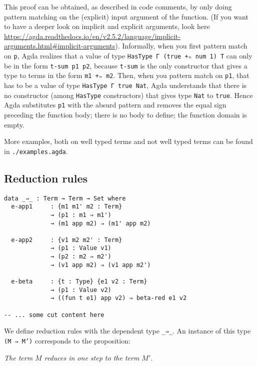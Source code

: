 \documentclass{article}
\begin{document}
\noindent
This proof can be obtained, as described in code comments, by only doing pattern matching on the (explicit) input argument of the function. (If you want to have a deeper look on implicit and explicit arguments, look here \url{https://agda.readthedocs.io/en/v2.5.2/language/implicit-arguments.html#implicit-arguments}).
Informally, when you first pattern match on \texttt{p}, Agda realizes that a value of type \texttt{HasType Γ (true +ₙ num 1) T} can only be in the form \texttt{t-sum p1 p2}, because \texttt{t-sum} is the only constructor that gives a type to terms in the form \texttt{m1 +ₙ m2}.
Then, when you pattern match on \texttt{p1}, that has to be a value of type \texttt{HasType Γ true Nat}, Agda understands that there is no constructor (among \texttt{HasType} constructors) that gives type \texttt{Nat} to \texttt{true}.
Hence Agda substitutes \texttt{p1} with the absurd pattern and removes the equal sign preceding the function body; there is no body to define; the function domain is empty.

\vspace{1em}
More examples, both on well typed terms and not well typed terms can be found in \texttt{./examples.agda}.


\subsection{Reduction rules}

\begin{verbatim}
data _⇒_ : Term → Term → Set where
  e-app1     : {m1 m1' m2 : Term}
             → (p1 : m1 ⇒ m1')
             → (m1 app m2) ⇒ (m1' app m2)

  e-app2     : {v1 m2 m2' : Term}
             → (p1 : Value v1)
             → (p2 : m2 ⇒ m2')
             → (v1 app m2) ⇒ (v1 app m2')

  e-beta     : {t : Type} {e1 v2 : Term}
             → (p1 : Value v2)
             → ((fun t e1) app v2) ⇒ beta-red e1 v2

-- ... some cut content here
\end{verbatim}

We define reduction rules with the dependent type \texttt{\_⇒\_}.
An instance of this type \texttt{(M ⇒ M')} corresponds to the proposition:

\vspace{1em}
\noindent
\textit{The term $M$ reduces in one step to the term $M'$.}
\vspace{1em}
\end{document}
